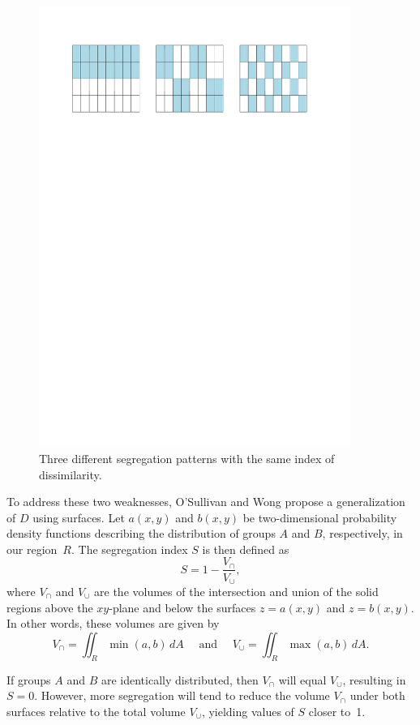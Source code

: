 \documentclass{article}
\theoremstyle{theorem}
\theoremstyle{definition}
\begin{document}
\begin{figure}[t!]\centering
  \includegraphics[width=4in]{checkerboard.pdf}
  \caption{Three different segregation patterns with the same index of dissimilarity.}
  \label{fig:checkerboard}
\end{figure}

To address these two weaknesses, O'Sullivan and Wong \cite{osullivanwong07} propose a generalization of $D$ using surfaces. Let $a(x,y)$ and $b(x,y)$ be two-dimensional probability density functions describing the distribution of groups $A$ and $B$, respectively, in our region~$R$. The segregation index $S$ is then defined as
\begin{equation}\label{eqn:S1}
  S = 1 - \frac{V_\cap}{V_\cup},
\end{equation}
where $V_\cap$ and $V_\cup$ are the volumes of the intersection and union of the solid regions above the $xy$-plane and below the surfaces $z = a(x,y)$ and $z=b(x,y)$. In other words, these volumes are given by
\begin{equation}\label{eqn:S2}
  V_\cap = \iint_R \min(a, b) \, dA \quad \text{ and } \quad V_\cup = \iint_R \max(a,b) \, dA.
\end{equation}

If groups $A$ and $B$ are identically distributed, then $V_\cap$ will equal $V_\cup$, resulting in $S = 0$. However, more segregation will tend to reduce the volume $V_\cap$ under both surfaces relative to the total volume $V_\cup$, yielding values of $S$ closer to~1.
\end{document}
